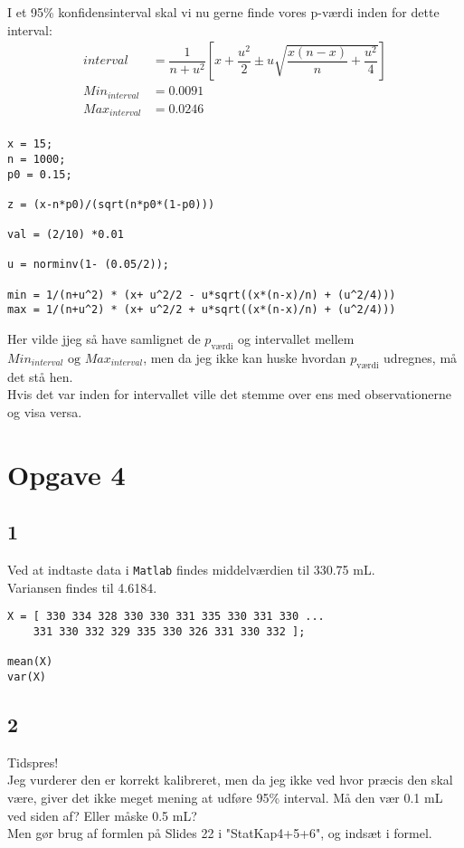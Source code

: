 \documentclass{article}
\begin{document}
I et 95\% konfidensinterval skal vi nu gerne finde vores p-værdi inden for dette interval:
\begin{align}
interval &= \dfrac{1}{n+u^2} \left[ x + \dfrac{u^2}{2} \pm u \sqrt{\dfrac{x(n-x)}{n}+\dfrac{u^2}{4}}\right] \\
Min_{interval} &= 0.0091 \\
Max_{interval} &= 0.0246 \\
\end{align}

\begin{lstlisting}[caption=Opgave 3, style=Code-Matlab, label=lst:opg33]
x = 15;
n = 1000;
p0 = 0.15;

z = (x-n*p0)/(sqrt(n*p0*(1-p0)))

val = (2/10) *0.01

u = norminv(1- (0.05/2));

min = 1/(n+u^2) * (x+ u^2/2 - u*sqrt((x*(n-x)/n) + (u^2/4)))
max = 1/(n+u^2) * (x+ u^2/2 + u*sqrt((x*(n-x)/n) + (u^2/4)))
\end{lstlisting}

Her vilde jjeg så have samlignet de $p_\text{værdi}$ og intervallet mellem $Min_{interval} \text{ og } Max_{interval}$, men da jeg ikke kan huske hvordan $p_\text{værdi}$ udregnes, må det stå hen. \\
Hvis det var inden for intervallet ville det stemme over ens med observationerne og visa versa.

\section*{Opgave 4} %

\subsection*{1} %

Ved at indtaste data i \texttt{Matlab} findes middelværdien til 330.75 mL. \\
Variansen findes til 4.6184.

\begin{lstlisting}[caption=Opgave 4.1, style=Code-Matlab, label=lst:41]
X = [ 330 334 328 330 330 331 335 330 331 330 ...
    331 330 332 329 335 330 326 331 330 332 ];

mean(X)
var(X)
\end{lstlisting}


\subsection*{2} %
Tidspres! \\
Jeg vurderer den er korrekt kalibreret, men da jeg ikke ved hvor præcis den skal være, giver det ikke meget mening at udføre 95\% interval. 
Må den vær 0.1 mL ved siden af? 
Eller måske 0.5 mL?
\\
Men gør brug af formlen på Slides 22 i "StatKap4+5+6", og indsæt i formel.
\end{document}
